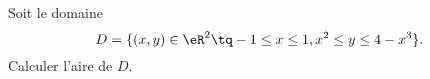 
\begin{exercice}\label{exoOutilsMath-0103}

    Soit le domaine
    \begin{equation}
        D=\{ (x,y)\in\eR^2\tq -1\leq x\leq 1,x^2\leq y\leq 4-x^3 \}.
    \end{equation}
    Calculer l'aire de $D$.

\end{exercice}
